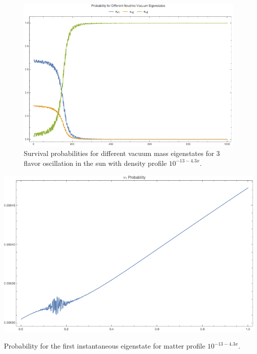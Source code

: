 \documentclass{tufte-handout}
\begin{document}
\begin{figure}
\centering
\includegraphics{assets/numericalMSW3Flavor-vac-eigen-prob.png}
\caption{Survival probabilities for different vacuum mass eigenstates for 3 flavor oscillation in the sun with density profile $10^{-13 - 4.3 x}$.}
\label{fig:my_label}
\end{figure}


\begin{marginfigure}[2\baselineskip]
\includegraphics{assets/numericalMSW3Flavor-Inst-Eigen-prob-1.png}
\caption{Probability for the first instantaneous eigenstate for matter profile $10^{-13 - 4.3 x}$.}
\label{fig:numericalMSW3Flavor-Inst-Eigen-prob-1}
\end{marginfigure}
\end{document}
